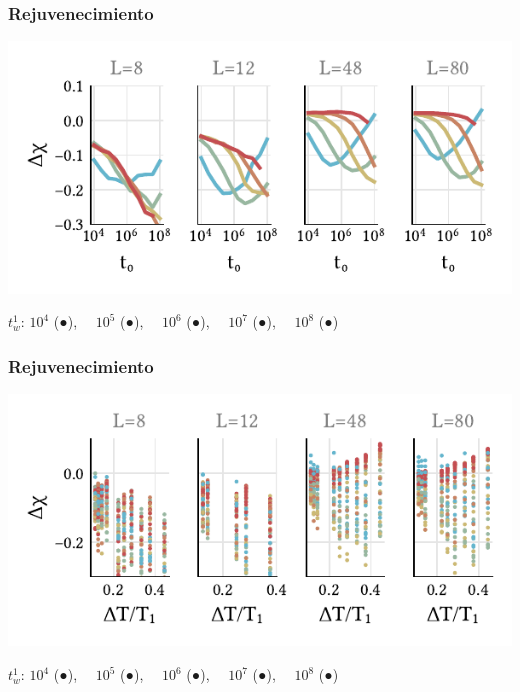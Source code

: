 \documentclass{beamer}
\begin{document}
\begin{frame}
  \frametitle{Rejuvenecimiento}
  \begin{center}
    \includegraphics[width=\textwidth]{../study_cases/trejanalysis/averaged_forbeamer.pdf}
  \end{center}
  \Large $t_w^1$: \quad
  $10^4$ (\textcolor{tw1_1e4}{●}), \ \
  $10^5$ (\textcolor{tw1_1e5}{●}), \ \
  $10^6$ (\textcolor{tw1_1e6}{●}), \ \
  $10^7$ (\textcolor{tw1_1e7}{●}), \ \
  $10^8$ (\textcolor{tw1_1e8}{●})
\end{frame}

\begin{frame}
  \frametitle{Rejuvenecimiento}
  \begin{center}
    \includegraphics[width=\textwidth]{../study_cases/trejanalysis/temps_forbeamer.pdf}
  \end{center}
  \Large $t_w^1$: \quad
  $10^4$ (\textcolor{tw1_1e4}{●}), \ \
  $10^5$ (\textcolor{tw1_1e5}{●}), \ \
  $10^6$ (\textcolor{tw1_1e6}{●}), \ \
  $10^7$ (\textcolor{tw1_1e7}{●}), \ \
  $10^8$ (\textcolor{tw1_1e8}{●})
\end{frame}
\end{document}
